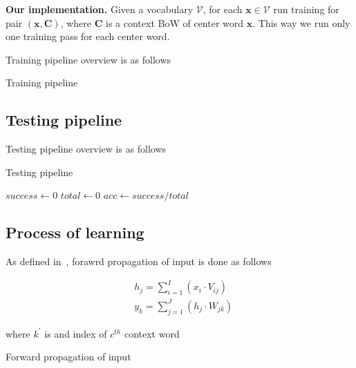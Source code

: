 \documentclass{article}
\newcommand{\SetAlgoStyle}{
	\SetAlgoNoLine
	\SetAlgoNoEnd
	\DontPrintSemicolon
}
\begin{document}
\textbf{Our implementation.}
Given a vocabulary $\mathcal{V}$, for each $\boldsymbol{x} \in \mathcal{V}$ run training for pair $(\boldsymbol{x}, \boldsymbol{C})$, where $\boldsymbol{C}$ is a context BoW of center word $\boldsymbol{x}$. This way we run only one training pass for each center word.

Training pipeline overview is as follows

\begin{algorithm}[H]
	\caption{Training pipeline}
	\SetAlgoStyle
\end{algorithm}

\subsection{Testing pipeline}

Testing pipeline overview is as follows

\begin{algorithm}[H]
	\caption{Testing pipeline}
	\SetAlgoStyle
	$success \gets 0$\;
	$total \gets 0$\;
	$acc \gets success / total$\;
\end{algorithm}

\subsection{Process of learning}

As defined in~\cite{1411.2738}, forawrd propagation of input is done as follows

\begin{align}
	&h_j = \sum_{i=1}^I (x_i \cdot V_{ij}) \\
	&y_k = \sum_{j=1}^J (h_j \cdot W_{jk})
\end{align}

where $k^\prime$ is and index of $c^{th}$ context word

\begin{algorithm}[H]
	\caption{Forward propagation of input}
	\SetAlgoStyle
\end{algorithm}
\end{document}
